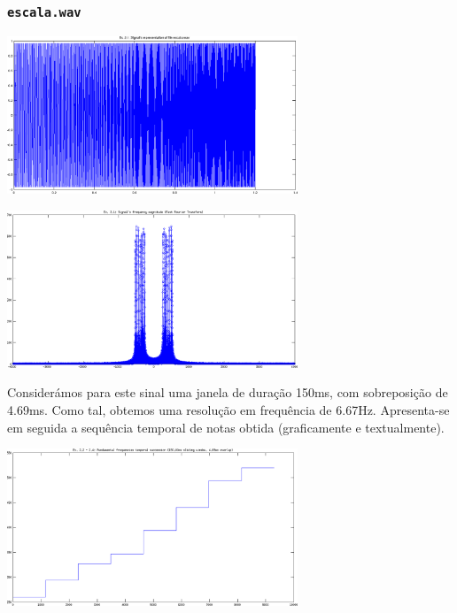 \documentclass[a4paper]{article}
\begin{document}
\subsubsection{\texttt{escala.wav}}
\begin{center}
	\includegraphics[width=0.65\textwidth]{images/ex_2_1_escala_sign.png}
\end{center}
\begin{center}
	\includegraphics[width=0.65\textwidth]{images/ex_2_1_escala_mag.png}
\end{center}

\indent \indent Considerámos para este sinal uma janela de duração 150ms, com sobreposição de 4.69ms. Como tal, obtemos uma resolução em frequência de 6.67Hz. Apresenta-se em seguida a sequência temporal de notas obtida (graficamente e textualmente).
\begin{center}
	\includegraphics[width=0.65\textwidth]{images/ex_2_2_escala.png}
\end{center}
\end{document}
